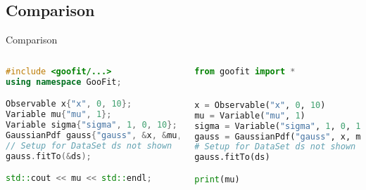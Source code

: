\documentclass[aspectratio=169, smaller]{beamer}
\begin{document}
\subsection{Comparison}
\begin{frame}[fragile]{Comparison}
    \begin{columns}[c]
        \begin{lstlisting}[language=C++]
#include <goofit/...>
using namespace GooFit;

Observable x{"x", 0, 10};
Variable mu{"mu", 1};
Variable sigma{"sigma", 1, 0, 10};
GaussianPdf gauss{"gauss", &x, &mu, &sigma};
// Setup for DataSet ds not shown
gauss.fitTo(&ds);

std::cout << mu << std::endl;
\end{lstlisting}
        \begin{lstlisting}[language=Python] 
from goofit import *


x = Observable("x", 0, 10)
mu = Variable("mu", 1)
sigma = Variable("sigma", 1, 0, 10)
gauss = GaussianPdf("gauss", x, mu, sigma)
# Setup for DataSet ds not shown
gauss.fitTo(ds)

print(mu)
        \end{lstlisting}
    \end{columns}
\end{frame}
\end{document}
